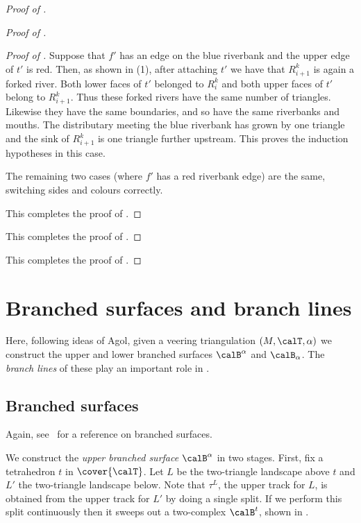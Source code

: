 \documentclass[12pt]{amsart}
\begin{document}
\begin{proof}[Proof of ]
\begin{proof}[Proof of ]
\begin{proof}[Proof of ]
Suppose that $f'$ has an edge on the blue riverbank and the upper edge of $t'$ is red.  Then, as shown in (1), after attaching $t'$ we have that $R^k_{i+1}$ is again a forked river.  Both lower faces of $t'$ belonged to $R^k_i$ and both upper faces of $t'$ belong to $R^k_{i+1}$.  Thus these forked rivers have the same number of triangles.  Likewise they have the same boundaries, and so have the same riverbanks and mouths.  The distributary meeting the blue riverbank has grown by one triangle and the sink of $R^k_{i+1}$ is one triangle further upstream.  This proves the induction hypotheses in this case. 

The remaining two cases (where $f'$ has a red riverbank edge) are the same, switching sides and colours correctly. 

This completes the proof of .
\end{proof}
This completes the proof of .
\end{proof}
This completes the proof of .
\end{proof}

\section{Branched surfaces and branch lines}
\label{Sec:SurfacesAndLines}

Here, following ideas of Agol, given a veering triangulation $(M, \calT, \alpha)$ we construct the upper and lower branched surfaces $\calB^\alpha$ and $\calB_\alpha$.  The \emph{branch lines} of these play an important role in .  

\subsection{Branched surfaces}
\label{Sec:UpperLowerSurfaces}

Again, see~\cite[Section~6.3]{Calegari07} for a reference on branched surfaces.  

We construct the \emph{upper branched surface} $\calB^\alpha$ in two stages.  First, fix a tetrahedron $t$ in $\cover{\calT}$.  Let $L$ be the two-triangle landscape above $t$ and $L'$ the two-triangle landscape below.  Note that $\tau^L$, the upper track for $L$, is obtained from the upper track for $L'$ by doing a single split.  If we perform this split continuously then it sweeps out a two-complex $\calB^t$, shown in .  
\end{document}
